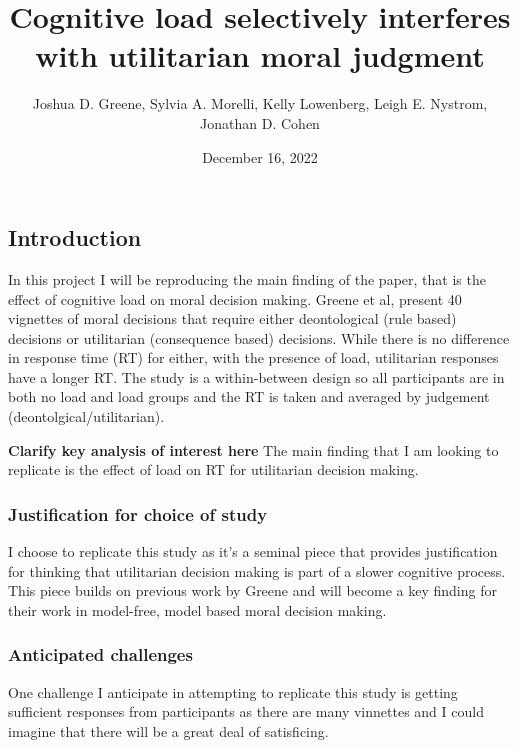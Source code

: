 \documentclass[
]{article}
\title{Cognitive load selectively interferes with utilitarian moral
judgment}
\author{Joshua D. Greene, Sylvia A. Morelli, Kelly Lowenberg, Leigh E.
Nystrom, Jonathan D. Cohen}
\date{December 16, 2022}
\begin{document}
\maketitle

{
\setcounter{tocdepth}{3}
\tableofcontents
}
\hypertarget{introduction}{%
\subsection{Introduction}\label{introduction}}

In this project I will be reproducing the main finding of the paper,
that is the effect of cognitive load on moral decision making. Greene et
al, present 40 vignettes of moral decisions that require either
deontological (rule based) decisions or utilitarian (consequence based)
decisions. While there is no difference in response time (RT) for
either, with the presence of load, utilitarian responses have a longer
RT. The study is a within-between design so all participants are in both
no load and load groups and the RT is taken and averaged by judgement
(deontolgical/utilitarian).

\textbf{Clarify key analysis of interest here} The main finding that I
am looking to replicate is the effect of load on RT for utilitarian
decision making.

\hypertarget{justification-for-choice-of-study}{%
\subsubsection{Justification for choice of
study}\label{justification-for-choice-of-study}}

I choose to replicate this study as it's a seminal piece that provides
justification for thinking that utilitarian decision making is part of a
slower cognitive process. This piece builds on previous work by Greene
and will become a key finding for their work in model-free, model based
moral decision making.

\hypertarget{anticipated-challenges}{%
\subsubsection{Anticipated challenges}\label{anticipated-challenges}}

One challenge I anticipate in attempting to replicate this study is
getting sufficient responses from participants as there are many
vinnettes and I could imagine that there will be a great deal of
satisficing.
\end{document}
